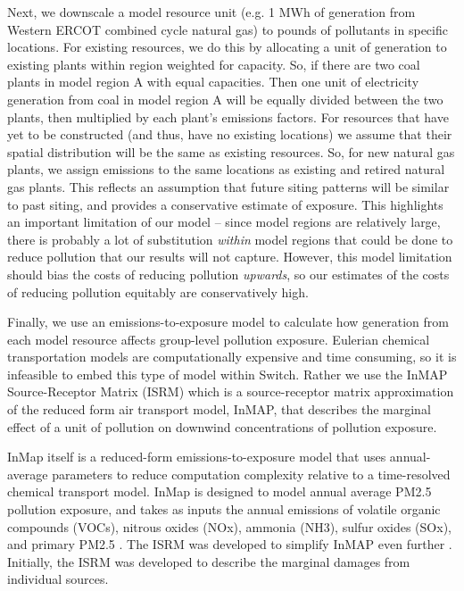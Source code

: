 \documentclass[a4paper]{article}
\theoremstyle{definition}
\theoremstyle{plain}
\begin{document}
Next, we downscale a model resource unit (e.g. 1 MWh of generation from Western ERCOT combined cycle natural gas) to pounds of pollutants in specific locations. For existing resources, we do this by allocating a unit of generation to existing plants within region weighted for capacity. So, if there are two coal plants in model region A with equal capacities. Then one unit of electricity generation from coal in model region A will be equally divided between the two plants, then multiplied by each plant's emissions factors. For resources that have yet to be constructed (and thus, have no existing locations) we assume that their spatial distribution will be the same as existing resources. So, for new natural gas plants, we assign emissions to the same locations as existing and retired natural gas plants. This reflects an assumption that future siting patterns will be similar to past siting, and provides a conservative estimate of exposure. This highlights an important limitation of our model -- since model regions are relatively large, there is probably a lot of substitution \textit{within} model regions that could be done to reduce pollution that our results will not capture. However, this model limitation should bias the costs of reducing pollution \textit{upwards}, so our estimates of the costs of reducing pollution equitably are conservatively high.

Finally, we use an emissions-to-exposure model to calculate how generation from each model resource affects group-level pollution exposure. Eulerian chemical transportation models are computationally expensive and time consuming, so it is infeasible to embed this type of model within Switch.  Rather we use the InMAP Source-Receptor Matrix (ISRM) which is a source-receptor matrix approximation of the reduced form air transport model, InMAP, that describes the marginal effect of a unit of pollution on downwind concentrations of pollution exposure.

InMap itself is a reduced-form emissions-to-exposure model that uses annual-average parameters to reduce computation complexity relative to a time-resolved chemical transport model. InMap is designed to model annual average PM2.5 pollution exposure, and takes as inputs the annual emissions of volatile organic compounds (VOCs), nitrous oxides (NOx), ammonia (NH3), sulfur oxides (SOx), and primary PM2.5 \citep{Tessum2017InMAP:Interventions}. The ISRM was developed to simplify InMAP even further \citep{Goodkind2019Fine-scaleEmissions}.  Initially, the ISRM was developed to describe the marginal damages from individual sources.  
\end{document}

